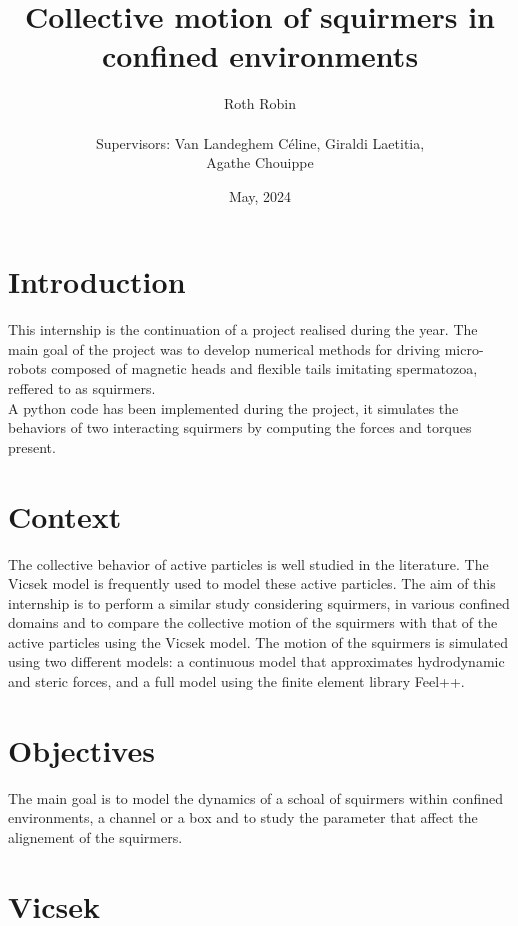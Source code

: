 \documentclass{article}
\begin{document}
\title{Collective motion of squirmers in confined environments}
\author{Roth Robin\\
\\
Supervisors: Van Landeghem Céline, Giraldi Laetitia,\\ Agathe Chouippe}
\date{May, 2024}
\maketitle

\tableofcontents

\section{Introduction}
This internship is the continuation of a project realised during the year. The main goal of the project was
to develop numerical methods for driving micro-robots composed of magnetic heads and flexible tails imitating spermatozoa, reffered to as squirmers.\\
A python code has been implemented during the project, it simulates the behaviors of two interacting squirmers by computing 
the forces and torques present.\\
\section{Context}
The collective behavior of active particles is well studied in the literature. 
The Vicsek model is frequently used to model these active particles. 
The aim of this internship is to perform a similar study considering squirmers, 
in various confined domains and to compare the collective motion of the squirmers with that of the active particles using the Vicsek model. 
The motion of the squirmers is simulated using two different models: a continuous model that approximates hydrodynamic and 
steric forces, and a full model using the finite element library Feel++.

\section{Objectives}
The main goal is to model the dynamics of a schoal of squirmers within confined environments, a channel or a box and to
 study the parameter that affect the alignement of the squirmers.

\section{Vicsek}
\end{document}
